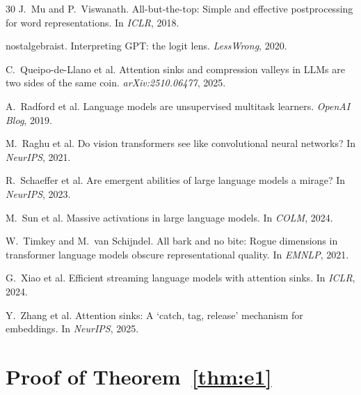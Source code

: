 \documentclass[11pt]{article}
\begin{document}
\begin{thebibliography}{30}
J.~Mu and P.~Viswanath. All-but-the-top: Simple and effective postprocessing for word representations. In \emph{ICLR}, 2018.

nostalgebraist. Interpreting GPT: the logit lens. \emph{LessWrong}, 2020.

C.~Queipo-de-Llano et al. Attention sinks and compression valleys in LLMs are two sides of the same coin. \emph{arXiv:2510.06477}, 2025.

A.~Radford et al. Language models are unsupervised multitask learners. \emph{OpenAI Blog}, 2019.

M.~Raghu et al. Do vision transformers see like convolutional neural networks? In \emph{NeurIPS}, 2021.

R.~Schaeffer et al. Are emergent abilities of large language models a mirage? In \emph{NeurIPS}, 2023.

M.~Sun et al. Massive activations in large language models. In \emph{COLM}, 2024.

W.~Timkey and M.~van Schijndel. All bark and no bite: Rogue dimensions in transformer language models obscure representational quality. In \emph{EMNLP}, 2021.

G.~Xiao et al. Efficient streaming language models with attention sinks. In \emph{ICLR}, 2024.

Y.~Zhang et al. Attention sinks: A `catch, tag, release' mechanism for embeddings. In \emph{NeurIPS}, 2025.

\end{thebibliography}

\newpage
\appendix

\section{Proof of Theorem~\ref{thm:e1}}\label{app:proof}
\end{document}
